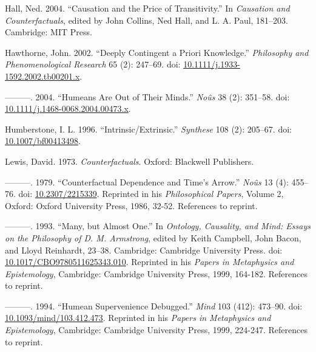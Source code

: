 \documentclass[
  11pt,
  letterpaper,
  DIV=11,
  numbers=noendperiod,
  twoside]{scrartcl}
\newlength{\cslhangindent}
\newenvironment{CSLReferences}[2] %
 {\begin{list}{}{%
  \setlength{\itemindent}{0pt}
  \setlength{\leftmargin}{0pt}
  \setlength{\parsep}{0pt}
  \ifodd #1
   \setlength{\leftmargin}{\cslhangindent}
   \setlength{\itemindent}{-1\cslhangindent}
  \fi
  \setlength{\itemsep}{#2\baselineskip}}}
 {\end{list}}
\begin{document}
\label{refs}
\begin{CSLReferences}{1}{0}
Hall, Ned. 2004. {``Causation and the Price of Transitivity.''} In
\emph{Causation and Counterfactuals}, edited by John Collins, Ned Hall,
and L. A. Paul, 181--203. Cambridge: MIT Press.

Hawthorne, John. 2002. {``Deeply Contingent a Priori Knowledge.''}
\emph{Philosophy and Phenomenological Research} 65 (2): 247--69. doi:
\href{https://doi.org/10.1111/j.1933-1592.2002.tb00201.x}{10.1111/j.1933-1592.2002.tb00201.x}.

---------. 2004. {``Humeans Are Out of Their Minds.''} \emph{No{û}s} 38
(2): 351--58. doi:
\href{https://doi.org/10.1111/j.1468-0068.2004.00473.x}{10.1111/j.1468-0068.2004.00473.x}.

Humberstone, I. L. 1996. {``Intrinsic/Extrinsic.''} \emph{Synthese} 108
(2): 205--67. doi:
\href{https://doi.org/10.1007/bf00413498}{10.1007/bf00413498}.

Lewis, David. 1973. \emph{Counterfactuals}. Oxford: Blackwell
Publishers.

---------. 1979. {``Counterfactual Dependence and Time's Arrow.''}
\emph{No{û}s} 13 (4): 455--76. doi:
\href{https://doi.org/10.2307/2215339}{10.2307/2215339}. Reprinted in
his \emph{Philosophical Papers}, Volume 2, Oxford: Oxford University
Press, 1986, 32-52. References to reprint.

---------. 1993. {``Many, but Almost One.''} In \emph{Ontology,
Causality, and Mind: Essays on the Philosophy of {D. M. Armstrong}},
edited by Keith Campbell, John Bacon, and Lloyd Reinhardt, 23--38.
Cambridge: Cambridge University Press. doi:
\href{https://doi.org/10.1017/CBO9780511625343.010}{10.1017/CBO9780511625343.010}.
Reprinted in his \emph{Papers in Metaphysics and Epistemology},
Cambridge: Cambridge University Press, 1999, 164-182. References to
reprint.

---------. 1994. {``Humean Supervenience Debugged.''} \emph{Mind} 103
(412): 473--90. doi:
\href{https://doi.org/10.1093/mind/103.412.473}{10.1093/mind/103.412.473}.
Reprinted in his \emph{Papers in Metaphysics and Epistemology},
Cambridge: Cambridge University Press, 1999, 224-247. References to
reprint.


\end{CSLReferences}
\end{document}
